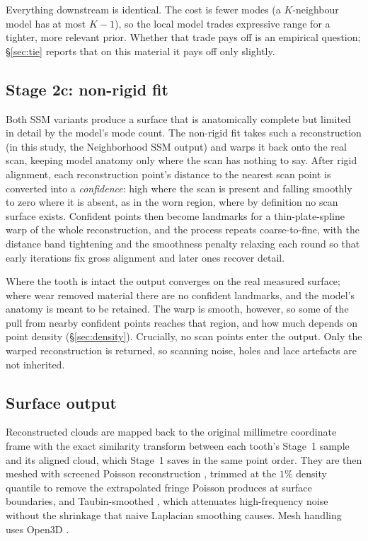 \documentclass[10pt,a4paper,twocolumn]{article}
\begin{document}
Everything downstream is identical. The cost is fewer modes (a $K$-neighbour
model has at most $K-1$), so the local model trades expressive range for a
tighter, more relevant prior. Whether that trade pays off is an empirical
question; \S\ref{sec:tie} reports that on this material it pays off only
slightly.

\subsection{Stage 2c: non-rigid fit}
\label{sec:nonrigid}

Both SSM variants produce a surface that is anatomically complete but limited in
detail by the model's mode count. The non-rigid fit takes such a reconstruction (in this study, the Neighborhood
SSM output) and warps it back onto the real scan, keeping model anatomy only where the scan has
nothing to say. After rigid alignment, each reconstruction point's distance to
the nearest scan point is converted into a \emph{confidence}: high where the scan
is present and falling smoothly to zero where it is absent, as in the worn
region, where by definition no scan surface exists. Confident points then become
landmarks for a thin-plate-spline warp \citep{bookstein1989tps} of the whole
reconstruction, and the process repeats coarse-to-fine, with the distance band
tightening and the smoothness penalty relaxing each round so that early
iterations fix gross alignment and later ones recover detail.

Where the tooth is intact the output converges on the real measured surface;
where wear removed material there are no confident landmarks, and the model's
anatomy is meant to be retained. The warp is smooth, however, so some of the pull
from nearby confident points reaches that region, and how much depends on point
density (\S\ref{sec:density}). Crucially, no scan points enter the output. Only
the warped reconstruction is returned, so scanning noise, holes and lace
artefacts are not inherited.

\subsection{Surface output}

Reconstructed clouds are mapped back to the original millimetre coordinate frame
with the exact similarity transform between each tooth's Stage~1 sample and its
aligned cloud, which Stage~1 saves in the same point order. They are then meshed with screened Poisson
reconstruction \citep{kazhdan2013poisson}, trimmed at the $1\%$ density quantile
to remove the extrapolated fringe Poisson produces at surface boundaries, and
Taubin-smoothed \citep{taubin1995smoothing}, which attenuates high-frequency
noise without the shrinkage that naive Laplacian smoothing causes. Mesh handling
uses Open3D \citep{zhou2018open3d}.
\end{document}
